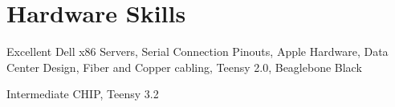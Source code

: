 \documentclass{tccv}
\begin{document}
\section{Hardware Skills}

\begin{factlist}

\item{Excellent}
     {Dell x86 Servers, Serial Connection Pinouts, Apple Hardware,
     Data Center Design, Fiber and Copper cabling, Teensy 2.0,
     Beaglebone Black}

\item{Intermediate}
     {CHIP, Teensy 3.2}

\end{factlist}
\end{document}
